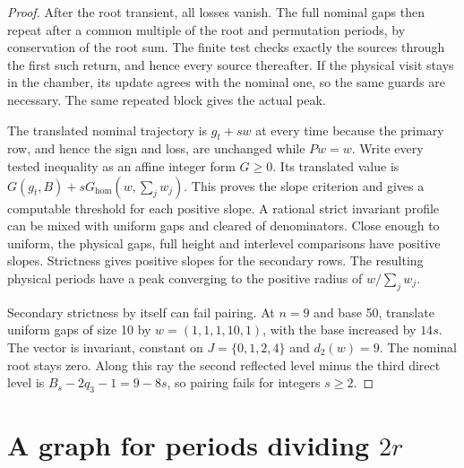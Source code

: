 \documentclass[11pt]{amsart}
\theoremstyle{definition}
\begin{document}
\begin{proof}
After the root transient, all losses vanish. The full
nominal gaps then repeat after a common multiple of the
root and permutation periods, by conservation of the
root sum. The finite test checks exactly the sources
through the first such return, and hence every source
thereafter. If the physical visit stays in the chamber,
its update agrees with the nominal one, so the same
guards are necessary. The same repeated block gives
the actual peak.

The translated nominal trajectory is \(g_t+sw\) at every
time because the primary row, and hence the sign and loss,
are unchanged while \(Pw=w\). Write every tested inequality
as an affine integer form \(G\ge0\). Its translated value is
\(G(g_t,B)+sG_{\mathrm{hom}}(w,\sum_jw_j)\).
This proves the slope criterion and gives a computable
threshold for each positive slope. A rational strict
invariant profile can be mixed with uniform gaps and
cleared of denominators. Close enough to uniform, the
physical gaps, full height and interlevel comparisons
have positive slopes. Strictness gives positive slopes
for the secondary rows. The resulting physical periods
have a peak converging to the positive radius of
\(w/\sum_jw_j\).

Secondary strictness by itself can fail pairing.
At \(n=9\) and base 50, translate uniform gaps of size 10
by \(w=(1,1,1,10,1)\), with the base increased by \(14s\).
The vector is invariant, constant on \(J=\{0,1,2,4\}\)
and \(d_2(w)=9\). The nominal root stays zero. Along
this ray the second reflected level minus the third
direct level is \(B_s-2q_3-1=9-8s\), so pairing fails
for integers \(s\ge2\).
\end{proof}

\section{A graph for periods dividing \texorpdfstring{\(2r\)}{2r}}
\label{sec:graph}
\end{document}
